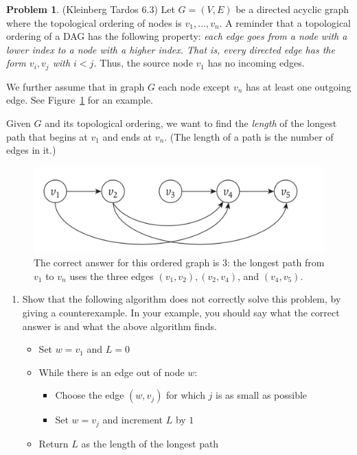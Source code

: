 \documentclass[12pt]{article}
\theoremstyle{definition}
\newtheorem{question}{Problem}
\begin{document}
\newpage
\begin{question}(Kleinberg Tardos 6.3) Let $G = (V, E)$ be a directed acyclic graph where the topological ordering
of nodes is $v_1, \ldots, v_n$.  A  reminder that a topological ordering of a DAG has the following property: {\em each edge goes from a node with a lower index to a node with a higher index. That is, every directed
edge has the form $v_i, v_j$ with $i < j$.}  Thus, the source node $v_1$ has no incoming edges.
 
We further assume that in graph $G$ each node except $v_n$ has at least one outgoing edge.
See Figure~\ref{fig:2} for an example.



Given $G$ and its topological ordering, we want to find the {\em length} of the longest path that begins
at $v_1$ and ends at $v_n$.  (The length of a path is the number of edges in it.)

\begin{figure}[h]
\centering
	\includegraphics[width=.7\linewidth]{dag.png}
	\caption{The correct answer for this ordered graph is 3: 
the longest path from $v_1$ to $v_n$ uses the three edges $(v_1, v_2),(v_2, v_4)$, and $(v_4, v_5)$.}\label{fig:2}
\end{figure}

\begin{enumerate}[label=(\alph*)]

\item Show that the following algorithm does not correctly solve this problem, by giving a counterexample. In your
example, you should say what the correct answer is and what the above algorithm finds.

    \begin{itemize}[noitemsep, nolistsep]
      \item Set $w = v_1$ and $L =0$ 
      \item While there is an edge out of node $w$:
        \begin{itemize}
          \item Choose the edge $(w, v_j)$ for which $j$ is as small as possible 
          \item Set $w = v_j$ and increment $L$ by $1$
        \end{itemize}
      \item Return $L$ as the length of the longest path 
    \end{itemize}



\end{enumerate}
\end{question}
\end{document}
